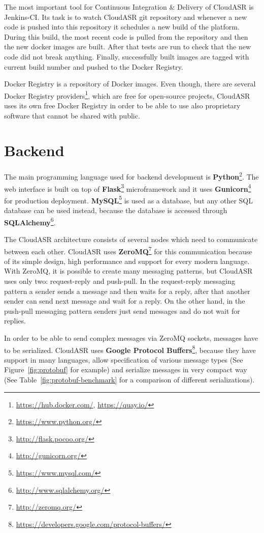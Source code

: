 The most important tool for Continuous Integration \& Delivery of CloudASR is Jenkins-CI.
Its task is to watch CloudASR git repository
  and whenever a new code is pushed into this repository it schedules a new build of the platform.
During this build, the most recent code is pulled from the repository and then the new docker images are built.
After that tests are run to check that the new code did not break anything.
Finally, successfully built images are tagged with current build number and pushed to the Docker Registry.


Docker Registry is a repository of Docker images.
Even though, there are several Docker Registry providers\footnote{\url{https://hub.docker.com/}, \url{https://quay.io/}},
  which are free for open-source projects,
  CloudASR uses its own free Docker Registry in order to be able to use also proprietary software that cannot be shared with public.


\section{Backend}
The main programming language used for backend development is \textbf{Python}\footnote{\url{https://www.python.org/}}.
The web interface is built on top of \textbf{Flask}\footnote{\url{http://flask.pocoo.org/}} microframework
  and it uses \textbf{Gunicorn}\footnote{\url{http://gunicorn.org/}} for production deployment.
\textbf{MySQL}\footnote{\url{https://www.mysql.com/}} is used as a database,
  but any other SQL database can be used instead,
  because the database is accessed  through \textbf{SQLAlchemy}\footnote{\url{http://www.sqlalchemy.org/}}.

The CloudASR architecture consists of several nodes which need to communicate between each other.
CloudASR uses \textbf{ZeroMQ}\footnote{\url{http://zeromq.org/}} for this communication
  because of its simple design, high performance and support for every modern language.
With ZeroMQ,
  it is possible to create many messaging patterns,
  but CloudASR uses only two: request-reply and push-pull.
In the request-reply messaging pattern a sender sends a message and then waits for a reply,
  after that another sender can send next message and wait for a reply.
On the other hand, in the push-pull messaging pattern senders just send messages and do not wait for replies.


In order to be able to send complex messages via ZeroMQ sockets, messages have to be serialized.
CloudASR uses \textbf{Google Protocol Buffers}\footnote{\url{https://developers.google.com/protocol-buffers/}},
  because they have support in many languages,
  allow specification of various message types (See Figure~\ref{fig:protobuf} for example)
  and serialize messages in very compact way
  (See Table~\ref{fig:protobuf-benchmark} for a comparison of different serializations).

